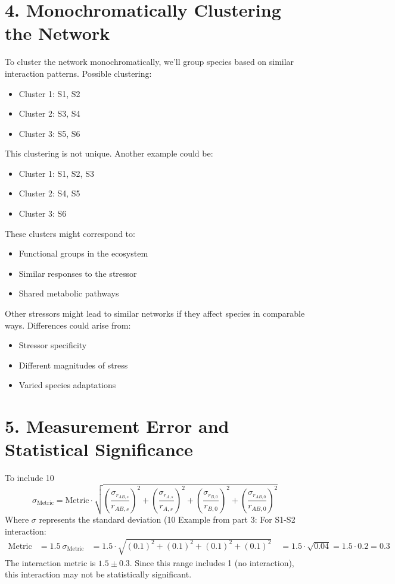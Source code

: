 \documentclass{article}
\begin{document}
\section*{4. Monochromatically Clustering the Network}
To cluster the network monochromatically, we'll group species based on similar interaction patterns.
Possible clustering:
\begin{itemize}
\item Cluster 1: S1, S2
\item Cluster 2: S3, S4
\item Cluster 3: S5, S6
\end{itemize}
This clustering is not unique. Another example could be:
\begin{itemize}
\item Cluster 1: S1, S2, S3
\item Cluster 2: S4, S5
\item Cluster 3: S6
\end{itemize}
These clusters might correspond to:
\begin{itemize}
\item Functional groups in the ecosystem
\item Similar responses to the stressor
\item Shared metabolic pathways
\end{itemize}
Other stressors might lead to similar networks if they affect species in comparable ways. Differences could arise from:
\begin{itemize}
\item Stressor specificity
\item Different magnitudes of stress
\item Varied species adaptations
\end{itemize}
\section*{5. Measurement Error and Statistical Significance}
To include 10%
\[ \sigma_{\text{Metric}} = \text{Metric} \cdot \sqrt{(\frac{\sigma_{r_{AB,s}}}{r_{AB,s}})^2 + (\frac{\sigma_{r_{A,s}}}{r_{A,s}})^2 + (\frac{\sigma_{r_{B,0}}}{r_{B,0}})^2 + (\frac{\sigma_{r_{AB,0}}}{r_{AB,0}})^2} \]
Where $\sigma$ represents the standard deviation (10%
Example from part 3:
For S1-S2 interaction:
\begin{align*}
\text{Metric} &= 1.5 \
\sigma_{\text{Metric}} &= 1.5 \cdot \sqrt{(0.1)^2 + (0.1)^2 + (0.1)^2 + (0.1)^2} \
&= 1.5 \cdot \sqrt{0.04} = 1.5 \cdot 0.2 = 0.3
\end{align*}
The interaction metric is $1.5 \pm 0.3$. Since this range includes 1 (no interaction), this interaction may not be statistically significant.
\end{document}
